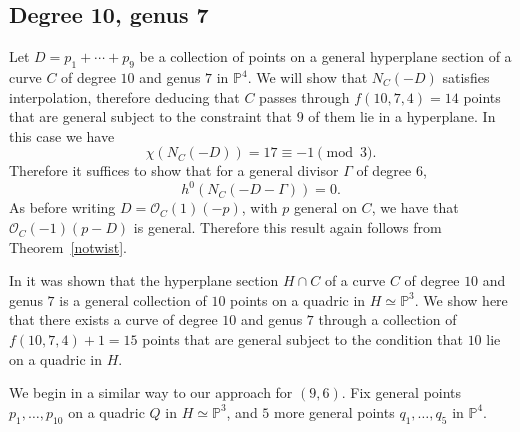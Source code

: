 \documentclass[11pt]{amsart}
\newcommand{\pp}{\mathbb{P}}
\renewcommand{\O}{\mathcal{O}}
\theoremstyle{definition}
\theoremstyle{remark}
\begin{document}
\subsection{Degree 10, genus 7}

Let $D = p_1+ \cdots+ p_{9}$ be a collection of points on a general hyperplane section of a curve $C$ of degree $10$ and genus $7$ in $\pp^4$.  We will show that $N_C(-D)$ satisfies interpolation, therefore deducing that $C$ passes through $f(10,7,4) = 14$ points that are general subject to the constraint that $9$ of them lie in a hyperplane.
In this case we have
\[\chi(N_C(-D)) = 17 \equiv -1 \pmod{3}. \]
Therefore it suffices to show that for a general divisor $\Gamma$ of degree $6$, 
\[h^0(N_C(-D-\Gamma)) = 0. \]
As before writing $D = \O_C(1)(-p)$, with $p$ general on $C$, we have that $\O_C(-1)(p-D)$ is general.  Therefore this result again follows from Theorem~\ref{notwist}.

In \cite{quadrics} it was shown that the hyperplane section $H \cap C$ of a curve $C$ of degree $10$ and genus $7$ is a general collection of $10$ points on a quadric in $H \simeq \pp^3$.  We show here that there exists a curve of degree $10$ and genus $7$ through a collection of $f(10,7,4)+1 = 15$ points that are general subject to the condition that $10$ lie on a quadric in $H$. 

We begin in a similar way to our approach for $(9,6)$.  Fix general points $p_1, \ldots, p_{10}$ on a quadric $Q$ in $H \simeq \pp^3$, and $5$ more general points $q_1, \ldots, q_5$ in $\pp^4$.  
\end{document}
